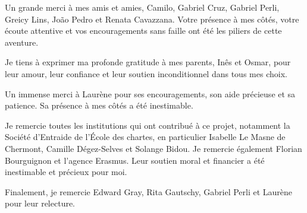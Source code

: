 Un grande merci à mes amis et amies, Camilo, Gabriel Cruz, Gabriel Perli, Greicy Lins, João Pedro et Renata Cavazzana. Votre présence à mes côtés, votre écoute attentive et vos encouragements sans faille ont été les piliers de cette aventure.

Je tiens à exprimer ma profonde gratitude à mes parents, Inês et Osmar, pour leur amour, leur confiance et leur soutien inconditionnel dans tous mes choix.

Un immense merci à Laurène pour ses encouragements, son aide précieuse et sa patience. Sa présence à mes côtés a été inestimable.

Je remercie toutes les institutions qui ont contribué à ce projet, notamment la Société d’Entraide de l’École des chartes, en particulier Isabelle Le Masne de Chermont, Camille Dégez-Selves et Solange Bidou. Je remercie également Florian Bourguignon et l'agence Erasmus. Leur soutien moral et financier a été inestimable et précieux pour moi.

Finalement, je remercie Edward Gray, Rita Gautschy, Gabriel Perli et Laurène pour leur relecture.